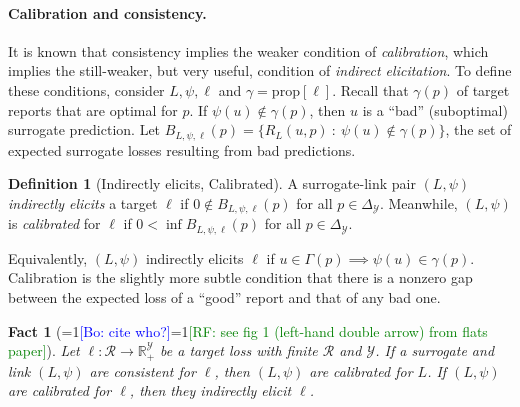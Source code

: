 \documentclass{article}
\newtheorem{fact}{Fact}
\theoremstyle{definition}\newtheorem{definition}{Definition}
\theoremstyle{definition}\newtheorem{assumption}{Assumption}
\newcommand{\Comments}{1}
\newcommand{\mynote}[2]{\ifnum\Comments=1\textcolor{#1}{#2}\fi}
\newcommand{\raf}[1]{\mynote{green}{[RF: #1]}}
\newcommand{\bo}[1]{\mynote{blue}{[Bo: #1]}}
\newcommand{\reals}{\mathbb{R}}
\newcommand{\prop}[1]{\mathrm{prop}[#1]}
\newcommand{\simplex}{\Delta_\Y}
\newcommand{\R}{\mathcal{R}}
\newcommand{\Y}{\mathcal{Y}}
\newcommand{\risk}[1]{\underline{#1}}
\newcommand{\inprod}[2]{\langle #1, #2 \rangle}%
\begin{document}
\paragraph{Calibration and consistency.}
It is known that consistency implies the weaker condition of \emph{calibration}, which implies the still-weaker, but very useful, condition of \emph{indirect elicitation}.
To define these conditions, consider $L,\psi,\ell$ and $\gamma = \prop{\ell}$.
Recall that $\gamma(p)$ of target reports that are optimal for $p$.
If $\psi(u) \not\in \gamma(p)$, then $u$ is a ``bad'' (suboptimal) surrogate prediction.
Let $B_{L,\psi,\ell}(p) = \{R_L(u,p) ~:~ \psi(u) \not\in \gamma(p)\}$, the set of expected surrogate losses resulting from bad predictions.
\begin{definition}[Indirectly elicits, Calibrated]
  A surrogate-link pair $(L,\psi)$ \emph{indirectly elicits} a target $\ell$ if $0 \not\in B_{L,\psi,\ell}(p)$ for all $p \in \simplex$.
  Meanwhile, $(L,\psi)$ is \emph{calibrated} for $\ell$ if $0 < \inf B_{L,\psi,\ell}(p)$ for all $p \in \simplex$.
\end{definition}
Equivalently, $(L,\psi)$ indirectly elicits $\ell$ if $u \in \Gamma(p) \implies \psi(u) \in \gamma(p)$.
Calibration is the slightly more subtle condition that there is a nonzero gap between the expected loss of a ``good'' report and that of any bad one.
\begin{fact}[\bo{cite who?}\raf{see fig 1 (left-hand double arrow) from flats paper}]
  \label{fact:consistent-calibrated-elicits}
  Let $\ell: \R \to \reals_+^{\Y}$ be a target loss with finite $\R$ and $\Y$.
  If a surrogate and link $(L,\psi)$ are consistent for $\ell$, then $(L,\psi)$ are calibrated for $L$.
  If $(L,\psi)$ are calibrated for $\ell$, then they indirectly elicit $\ell$.
\end{fact}

\end{document}
